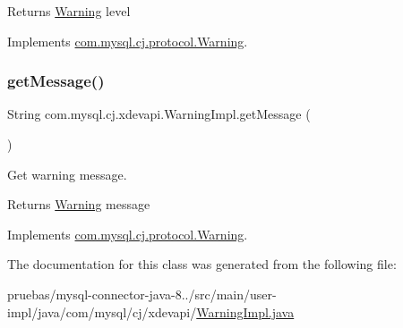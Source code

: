 \begin{DoxyReturn}{Returns}
\mbox{\hyperlink{interfacecom_1_1mysql_1_1cj_1_1xdevapi_1_1_warning}{Warning}} level 
\end{DoxyReturn}


Implements \mbox{\hyperlink{interfacecom_1_1mysql_1_1cj_1_1protocol_1_1_warning_a37396ddf66dbd9e7cd386825e0a47966}{com.\+mysql.\+cj.\+protocol.\+Warning}}.

\mbox{\label{classcom_1_1mysql_1_1cj_1_1xdevapi_1_1_warning_impl_afeeda25bc13726f35b4198262c46f605}} 
\subsubsection{\texorpdfstring{get\+Message()}{getMessage()}}
{\footnotesize\ttfamily String com.\+mysql.\+cj.\+xdevapi.\+Warning\+Impl.\+get\+Message (\begin{DoxyParamCaption}{ }\end{DoxyParamCaption})}

Get warning message.

\begin{DoxyReturn}{Returns}
\mbox{\hyperlink{interfacecom_1_1mysql_1_1cj_1_1xdevapi_1_1_warning}{Warning}} message 
\end{DoxyReturn}


Implements \mbox{\hyperlink{interfacecom_1_1mysql_1_1cj_1_1protocol_1_1_warning_ae984bc89101642345d59a9dac4b32782}{com.\+mysql.\+cj.\+protocol.\+Warning}}.



The documentation for this class was generated from the following file\+:\begin{DoxyCompactItemize}
\item 
pruebas/mysql-\/connector-\/java-\/8../src/main/user-\/impl/java/com/mysql/cj/xdevapi/\mbox{\hyperlink{_warning_impl_8java}{Warning\+Impl.\+java}}\end{DoxyCompactItemize}
